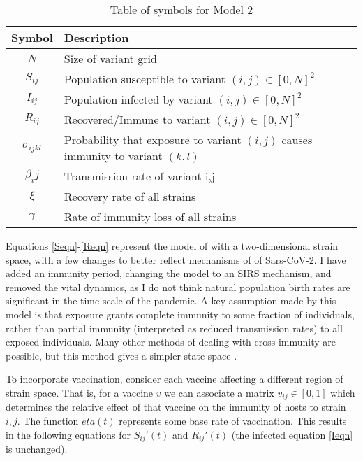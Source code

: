 \documentclass{article}
\begin{document}
\begin{table}[h!]
    \begin{center}
        \begin{tabular}{c|l}
            Symbol & Description \\
            \hline
            \hline
            $N$ & Size of variant grid \\
            $S_{ij}$ & Population susceptible to variant $(i,j) \in [0,N]^2$ \\
            $I_{ij}$ & Population infected by variant $(i,j) \in [0,N]^2$\\
            $R_{ij}$ & Recovered/Immune to variant $(i,j) \in [0,N]^2$\\
            $\sigma_{ijkl}$ & Probability that exposure to variant $(i,j)$ causes immunity to variant $(k,l)$\\
            $\beta_ij$ & Transmission rate of variant {i,j} \\
            $\xi$ & Recovery rate of all strains \\
            $\gamma$ & Rate of immunity loss of all strains \\
    \end{tabular}
    \caption{Table of symbols for Model 2}

    \label{variables_2}
    \end{center}
\end{table}

    

Equations \ref{Seqn}-\ref{Reqn} represent the model of \cite{gogDynamicsSelectionManystrain2002} with a two-dimensional strain space, with a few changes to better reflect mechanisms of of Sars-CoV-2. I have added an immunity period, changing the model to an SIRS mechanism, and removed the vital dynamics, as I do not think natural population birth rates are significant in the time scale of the pandemic. A key assumption made by this model is that exposure grants complete immunity to some fraction of individuals, rather than partial immunity (interpreted as reduced transmission rates) to all exposed individuals. Many other methods of dealing with cross-immunity are possible, but this method gives a simpler state space \cite{Castillo_Chavez_Blower_Driessche_Kirschner_Yakubu_2002}.


To incorporate vaccination, consider each vaccine affecting a different region of strain space. That is, for a vaccine $v$ we can associate a matrix $v_{ij} \in [0,1]$ which determines the relative effect of that vaccine on the immunity of hosts to strain $i,j$. The function $eta(t)$ represents some base rate of vaccination. This results in the following equations for $S_{ij}'(t)$ and $ R_{ij}'(t) $ (the infected equation \ref{Ieqn} is unchanged).
\end{document}
